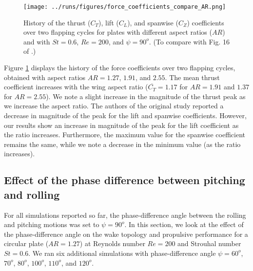 \begin{figure}
  \centering
  \texttt{[image: ../runs/figures/force\_coefficients\_compare\_AR.png]}
  \caption{History of the thrust ($C_T$), lift ($C_L$), and spanwise ($C_Z$) coefficients over two flapping cycles for plates with different aspect ratios ($AR$) and with $St = 0.6$, $Re = 200$, and $\psi = 90^o$. (To compare with Fig. 16 of \citet{li_dong_2016}.)}
  \label{fig:ratio_force_coefficients}
\end{figure}

Figure \ref{fig:ratio_force_coefficients} displays the history of the force coefficients over two flapping cycles, obtained with aspect ratios $AR = 1.27$, $1.91$, and $2.55$.
The mean thrust coefficient increases with the wing aspect ratio ($\overline{C_T} = 1.17$ for $AR = 1.91$ and $1.37$ for $AR = 2.55$).
We note a slight increase in the magnitude of the thrust peak as we increase the aspect ratio.
The authors of the original study reported a decrease in magnitude of the peak for the lift and spanwise coefficients.
However, our results show an increase in magnitude of the peak for the lift coefficient as the ratio increases.
Furthermore, the maximum value for the spanwise coefficient remains the same, while we note a decrease in the minimum value (as the ratio increases).

\subsection{Effect of the phase difference between pitching and rolling}

For all simulations reported so far, the phase-difference angle between the rolling and pitching motions was set to $\psi = 90^o$.
In this section, we look at the effect of the phase-difference angle on the wake topology and propulsive performance for a circular plate ($AR = 1.27$) at Reynolds number $Re = 200$ and Strouhal number $St = 0.6$.
We ran six additional simulations with phase-difference angle $\psi = 60^o$, $70^o$, $80^o$, $100^o$, $110^o$, and $120^o$.

